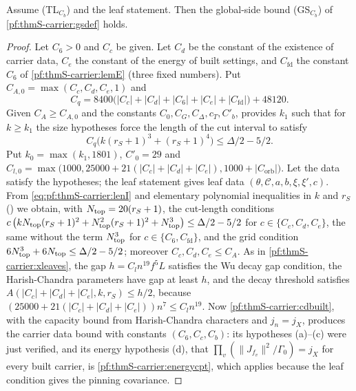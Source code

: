 \begin{theorem}\label{pf:thmS-carrier:xside-proof}
Assume (TL$_{C_b}$) and the leaf statement. Then the global-side bound (GS$_{C_b}$) of \cref{pf:thmS-carrier:gsdef} holds.
\end{theorem}

\begin{proof}
Let $C_6>0$ and $C_c$ be given. Let $C_d$ be the constant of the existence of carrier data, $C_e$ the constant of the energy
of built settings, and $C_{\mathrm{fd}}$ the constant $C_6$ of \cref{pf:thmS-carrier:lemE} (three fixed numbers). Put
$C_{A,0}=\max(C_c,C_d,C_e,1)$ and
\[
C_q=8400\bigl(|C_c|+|C_d|+|C_6|+|C_e|+|C_{\mathrm{fd}}|\bigr)+48120 .
\]
Given $C_A\ge C_{A,0}$ and the constants $C_0,C_G,C_\Delta,c_T,C'_b$, 
provides $k_1$ such that for $k\ge k_1$ the size hypotheses force the length of the cut interval to satisfy
\begin{equation}\label{eq:pf:thmS-carrier:lenI}
C_q\bigl(k(r_S+1)^3+(r_S+1)^4\bigr)\le\Delta/2-5/2 .
\end{equation}
Put $k_0=\max(k_1,1801)$, $C'_0=29$ and $C_{l,0}=\max\bigl(1000,25000+21(|C_c|+|C_d|+|C_e|),1000+|C_{\mathrm{orb}}|\bigr)$. Let
the data satisfy the hypotheses; the leaf statement gives leaf data $(\theta,\mathcal C,a,b,\xi,\xi',c)$. From
\eqref{eq:pf:thmS-carrier:lenI} and elementary polynomial inequalities in $k$ and $r_S$
() we obtain, with $N_{\mathrm{top}}=20(r_S+1)$, the cut-length conditions
$c\,\bigl(kN_{\mathrm{top}}(r_S+1)^2+N_{\mathrm{top}}^2(r_S+1)^2+N_{\mathrm{top}}^3\bigr)\le\Delta/2-5/2$ for
$c\in\{C_c,C_d,C_e\}$, the same without the term $N_{\mathrm{top}}^3$ for $c\in\{C_6,C_{\mathrm{fd}}\}$, and the grid condition
$6N_{\mathrm{top}}^3+6N_{\mathrm{top}}\le\Delta/2-5/2$; moreover $C_c,C_d,C_e\le C_A$. As in \cref{pf:thmS-carrier:xleaves}, the
gap $h=C_ln^{19}f^5L$ satisfies the Wu decay gap condition, the Harish-Chandra parameters have gap at least $h$, and the decay
threshold satisfies $A(|C_c|+|C_d|+|C_e|,k,r_S)\le h/2$, because $(25000+21(|C_c|+|C_d|+|C_e|))n^7\le C_ln^{19}$. Now
\cref{pf:thmS-carrier:cdbuilt}, with the capacity bound from Harish-Chandra characters
 and $j_n=j_X$, produces the carrier data bound with constants
$(C_6,C_c,C_b)$: its hypotheses (a)--(c) were just verified, and its energy hypothesis (d), that
$\prod_v(\|J_{f_v}\|^2/\Gamma_0)=j_X$ for every built carrier, is \cref{pf:thmS-carrier:energycpt}, which applies because the
leaf condition gives the pinning covariance.
\end{proof}

